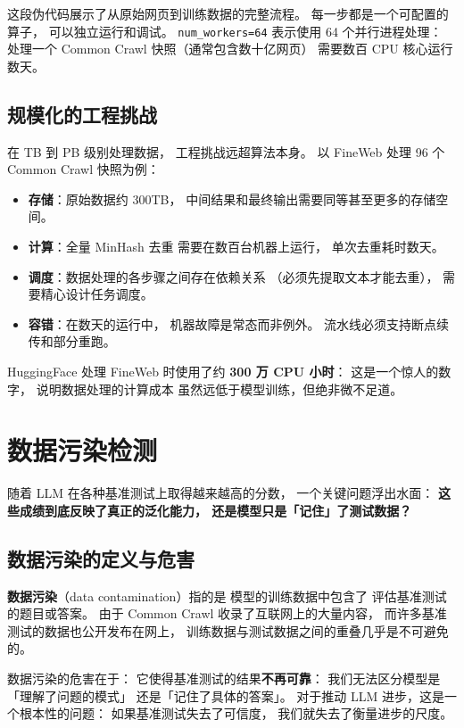这段伪代码展示了从原始网页到训练数据的完整流程。
每一步都是一个可配置的算子，
可以独立运行和调试。
\texttt{num\_workers=64} 表示使用 64 个并行进程处理：
处理一个 Common Crawl 快照（通常包含数十亿网页）
需要数百 CPU 核心运行数天。

\subsection{规模化的工程挑战}

在 TB 到 PB 级别处理数据，
工程挑战远超算法本身。
以 FineWeb 处理 96 个 Common Crawl 快照为例：

\begin{itemize}[noitemsep]
  \item \textbf{存储}：原始数据约 300TB，
        中间结果和最终输出需要同等甚至更多的存储空间。
  \item \textbf{计算}：全量 MinHash 去重
        需要在数百台机器上运行，
        单次去重耗时数天。
  \item \textbf{调度}：数据处理的各步骤之间存在依赖关系
        （必须先提取文本才能去重），
        需要精心设计任务调度。
  \item \textbf{容错}：在数天的运行中，
        机器故障是常态而非例外。
        流水线必须支持断点续传和部分重跑。
\end{itemize}

HuggingFace 处理 FineWeb 时使用了约 \textbf{300 万 CPU 小时}：
这是一个惊人的数字，
说明数据处理的计算成本
虽然远低于模型训练，但绝非微不足道。

\section{数据污染检测}

随着 LLM 在各种基准测试上取得越来越高的分数，
一个关键问题浮出水面：
\textbf{这些成绩到底反映了真正的泛化能力，
还是模型只是「记住」了测试数据？}

\subsection{数据污染的定义与危害}

\textbf{数据污染}（data contamination）指的是
模型的训练数据中包含了
评估基准测试的题目或答案。
由于 Common Crawl 收录了互联网上的大量内容，
而许多基准测试的数据也公开发布在网上，
训练数据与测试数据之间的重叠几乎是不可避免的。

数据污染的危害在于：
它使得基准测试的结果\textbf{不再可靠}：
我们无法区分模型是「理解了问题的模式」
还是「记住了具体的答案」。
对于推动 LLM 进步，这是一个根本性的问题：
如果基准测试失去了可信度，
我们就失去了衡量进步的尺度。

